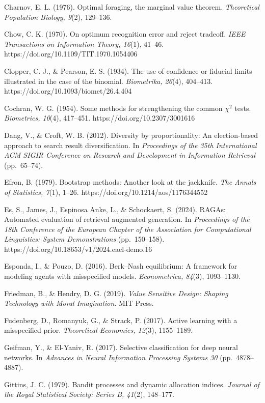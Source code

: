 \documentclass[
  11pt]{article}
\begin{document}
Charnov, E. L. (1976). Optimal foraging, the marginal value theorem.
\emph{Theoretical Population Biology, 9}(2), 129--136.

Chow, C. K. (1970). On optimum recognition error and reject tradeoff.
\emph{IEEE Transactions on Information Theory, 16}(1), 41--46.
https://doi.org/10.1109/TIT.1970.1054406

Clopper, C. J., \& Pearson, E. S. (1934). The use of confidence or
fiducial limits illustrated in the case of the binomial.
\emph{Biometrika, 26}(4), 404--413.
https://doi.org/10.1093/biomet/26.4.404

Cochran, W. G. (1954). Some methods for strengthening the common
\(\chi^2\) tests. \emph{Biometrics, 10}(4), 417--451.
https://doi.org/10.2307/3001616

Dang, V., \& Croft, W. B. (2012). Diversity by proportionality: An
election-based approach to search result diversification. In
\emph{Proceedings of the 35th International ACM SIGIR Conference on
Research and Development in Information Retrieval} (pp.~65--74).

Efron, B. (1979). Bootstrap methods: Another look at the jackknife.
\emph{The Annals of Statistics, 7}(1), 1--26.
https://doi.org/10.1214/aos/1176344552

Es, S., James, J., Espinosa Anke, L., \& Schockaert, S. (2024). RAGAs:
Automated evaluation of retrieval augmented generation. In
\emph{Proceedings of the 18th Conference of the European Chapter of the
Association for Computational Linguistics: System Demonstrations}
(pp.~150--158). https://doi.org/10.18653/v1/2024.eacl-demo.16

Esponda, I., \& Pouzo, D. (2016). Berk--Nash equilibrium: A framework
for modeling agents with misspecified models. \emph{Econometrica,
84}(3), 1093--1130.

Friedman, B., \& Hendry, D. G. (2019). \emph{Value Sensitive Design:
Shaping Technology with Moral Imagination}. MIT Press.

Fudenberg, D., Romanyuk, G., \& Strack, P. (2017). Active learning with
a misspecified prior. \emph{Theoretical Economics, 12}(3), 1155--1189.

Geifman, Y., \& El-Yaniv, R. (2017). Selective classification for deep
neural networks. In \emph{Advances in Neural Information Processing
Systems 30} (pp.~4878--4887).

Gittins, J. C. (1979). Bandit processes and dynamic allocation indices.
\emph{Journal of the Royal Statistical Society: Series B, 41}(2),
148--177.
\end{document}
